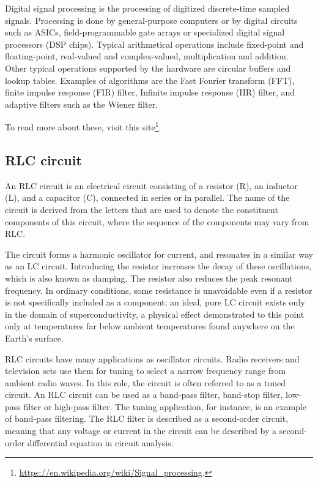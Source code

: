 \documentclass[12pt]{article}
\theoremstyle{plain}
\begin{document}
Digital signal processing is the processing of digitized discrete-time sampled signals. Processing is done by general-purpose computers or by digital circuits such as ASICs, field-programmable gate arrays or specialized digital signal processors (DSP chips). Typical arithmetical operations include fixed-point and floating-point, real-valued and complex-valued, multiplication and addition. Other typical operations supported by the hardware are circular buffers and lookup tables. Examples of algorithms are the Fast Fourier transform (FFT), finite impulse response (FIR) filter, Infinite impulse response (IIR) filter, and adaptive filters such as the Wiener filter.

To read more about these, visit this site\footnote{\url{https://en.wikipedia.org/wiki/Signal_processing}.}.


\subsection{RLC circuit}

An RLC circuit is an electrical circuit consisting of a resistor (R), an inductor (L), and a capacitor (C), connected in series or in parallel. The name of the circuit is derived from the letters that are used to denote the constituent components of this circuit, where the sequence of the components may vary from RLC.

The circuit forms a harmonic oscillator for current, and resonates in a similar way as an LC circuit. Introducing the resistor increases the decay of these oscillations, which is also known as damping. The resistor also reduces the peak resonant frequency. In ordinary conditions, some resistance is unavoidable even if a resistor is not specifically included as a component; an ideal, pure LC circuit exists only in the domain of superconductivity, a physical effect demonstrated to this point only at temperatures far below ambient temperatures found anywhere on the Earth's surface.

RLC circuits have many applications as oscillator circuits. Radio receivers and television sets use them for tuning to select a narrow frequency range from ambient radio waves. In this role, the circuit is often referred to as a tuned circuit. An RLC circuit can be used as a band-pass filter, band-stop filter, low-pass filter or high-pass filter. The tuning application, for instance, is an example of band-pass filtering. The RLC filter is described as a second-order circuit, meaning that any voltage or current in the circuit can be described by a second-order differential equation in circuit analysis.
\end{document}
